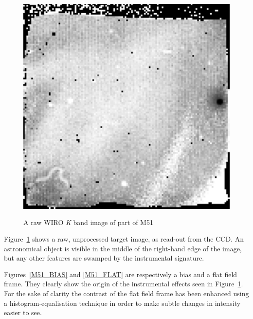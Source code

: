 \documentclass[twoside,11pt]{starlink}
\begin{document}
\begin{figure}[htbp]
   \centering
   \includegraphics[totalheight=3.5in]{sc5_m51_raw}
   \begin{quote}
   \caption{A raw WIRO \textit{K}\/ band image of part of M51
   \label{M51_RAW} }
   \end{quote}
\end{figure}

Figure~\ref{M51_RAW} shows a raw, unprocessed target image, as read-out from
the CCD.  An astronomical object is visible in the middle of the right-hand
edge of the image, but any other features are swamped by the instrumental
signature.

Figures~\ref{M51_BIAS} and \ref{M51_FLAT} are respectively a bias and a
flat field frame.  They clearly show the origin of the instrumental effects
seen in Figure~\ref{M51_RAW}.  For the sake of clarity the contrast of the
flat field frame has been enhanced using a histogram-equalisation
technique in order to make subtle changes in intensity easier to see.
\end{document}
